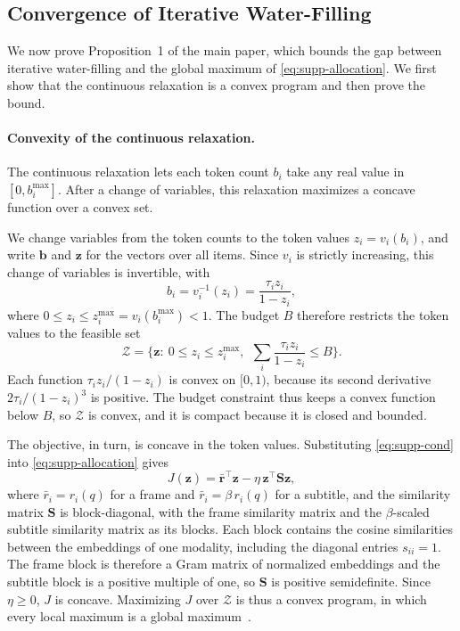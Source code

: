 \subsection{Convergence of Iterative Water-Filling}
\label{sec:supp-convergence}
\label{sec:supp-convex}

We now prove Proposition~1 of the main paper, which bounds the gap between iterative water-filling and the global maximum of \cref{eq:supp-allocation}. We first show that the continuous relaxation is a convex program and then prove the bound.

\paragraph{Convexity of the continuous relaxation.}
The continuous relaxation lets each token count $b_i$ take any real value in $[0,b_i^{\max}]$. After a change of variables, this relaxation maximizes a concave function over a convex set.

We change variables from the token counts to the token values $z_i=v_i(b_i)$, and write $\mathbf b$ and $\mathbf z$ for the vectors over all items. Since $v_i$ is strictly increasing, this change of variables is invertible, with
\begin{equation}
  b_i=v_i^{-1}(z_i)=\frac{\tau_i z_i}{1-z_i} ,
\label{eq:supp-inverse}
\end{equation}
where $0\le z_i\le z_i^{\max}=v_i(b_i^{\max})<1$.
The budget $B$ therefore restricts the token values to the feasible set
\begin{equation}
  \mathcal Z=\Big\{\mathbf z:\ 0\le z_i\le z_i^{\max},\ \ \sum_{i}\frac{\tau_i z_i}{1-z_i}\le B\Big\} .
\label{eq:supp-feasible}
\end{equation}
Each function $\tau_i z_i/(1-z_i)$ is convex on $[0,1)$, because its second derivative $2\tau_i/(1-z_i)^3$ is positive. The budget constraint thus keeps a convex function below $B$, so $\mathcal Z$ is convex, and it is compact because it is closed and bounded.

The objective, in turn, is concave in the token values. Substituting \cref{eq:supp-cond} into \cref{eq:supp-allocation} gives
\begin{equation}
  J(\mathbf z)=\bar{\mathbf r}^{\top}\mathbf z-\eta\,\mathbf z^{\top}\mathbf S\mathbf z ,
\label{eq:supp-quadratic}
\end{equation}
where $\bar r_i=r_i(q)$ for a frame and $\bar r_i=\beta\,r_i(q)$ for a subtitle, and the similarity matrix $\mathbf S$ is block-diagonal, with the frame similarity matrix and the $\beta$-scaled subtitle similarity matrix as its blocks. Each block contains the cosine similarities between the embeddings of one modality, including the diagonal entries $s_{ii}=1$. The frame block is therefore a Gram matrix of normalized embeddings and the subtitle block is a positive multiple of one, so $\mathbf S$ is positive semidefinite. Since $\eta\ge0$, $J$ is concave. Maximizing $J$ over $\mathcal Z$ is thus a convex program, in which every local maximum is a global maximum~\cite{boyd2004}.


